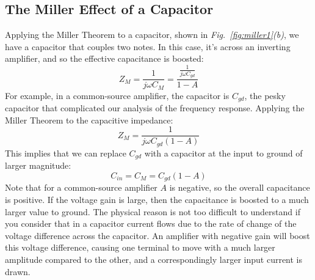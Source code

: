 \subsection{The Miller Effect of a Capacitor}
Applying the Miller Theorem to a capacitor, shown in \emph{Fig.~\ref{fig:miller1}(b)}, we have a capacitor that couples two notes.  In this case, it's across an inverting amplifier, and so the effective capacitance is boosted:
    \begin{equation}
        Z_M = \frac{1}{j\omega C_M} = \frac{\frac{1}{j\omega C_{gd}}}{ 1 - A}
    \end{equation}
For example, in a common-source amplifier, the capacitor is $C_{gd}$, the pesky capacitor that complicated our analysis of the frequency response.  Applying the Miller Theorem to the capacitive impedance: 
    \begin{equation}
        Z_M = \frac{1}{j\omega C_{gd} (1 - A)}
    \end{equation}
This implies that we can replace $C_{gd}$ with a capacitor at the input to ground of larger magnitude:
    \begin{equation}
        C_{in} = C_M  = C_{gd} (1-A)
    \end{equation}
Note that for a common-source amplifier $A$ is negative, so the overall capacitance is positive.  If the voltage gain is large, then the capacitance is boosted to a much larger value to ground.  The physical reason is not too difficult to understand if you consider that in a capacitor current flows due to the rate of change of the voltage difference  across the capacitor.  An amplifier with negative gain will boost this voltage difference, causing one terminal to move with a much larger amplitude compared to the other, and a correspondingly larger input current is drawn. 
